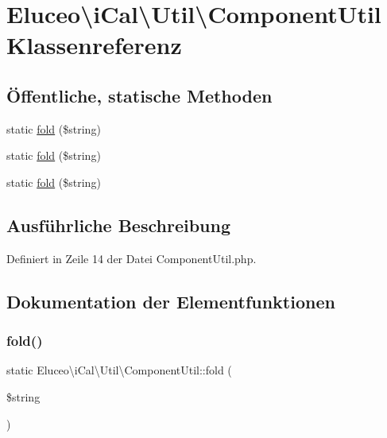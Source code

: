\hypertarget{class_eluceo_1_1i_cal_1_1_util_1_1_component_util}{}\section{Eluceo\textbackslash{}i\+Cal\textbackslash{}Util\textbackslash{}Component\+Util Klassenreferenz}
\label{class_eluceo_1_1i_cal_1_1_util_1_1_component_util}
\subsection*{Öffentliche, statische Methoden}
\begin{DoxyCompactItemize}
\item 
static \mbox{\hyperlink{class_eluceo_1_1i_cal_1_1_util_1_1_component_util_a8b295bedfc690ba2f52a884f52726d22}{fold}} (\$string)
\item 
static \mbox{\hyperlink{class_eluceo_1_1i_cal_1_1_util_1_1_component_util_a8b295bedfc690ba2f52a884f52726d22}{fold}} (\$string)
\item 
static \mbox{\hyperlink{class_eluceo_1_1i_cal_1_1_util_1_1_component_util_a8b295bedfc690ba2f52a884f52726d22}{fold}} (\$string)
\end{DoxyCompactItemize}


\subsection{Ausführliche Beschreibung}


Definiert in Zeile 14 der Datei Component\+Util.\+php.



\subsection{Dokumentation der Elementfunktionen}
\mbox{\label{class_eluceo_1_1i_cal_1_1_util_1_1_component_util_a8b295bedfc690ba2f52a884f52726d22}} 
\subsubsection{\texorpdfstring{fold()}{fold()}\hspace{0.1cm}{\footnotesize\ttfamily [1/3]}}
{\footnotesize\ttfamily static Eluceo\textbackslash{}i\+Cal\textbackslash{}\+Util\textbackslash{}\+Component\+Util\+::fold (\begin{DoxyParamCaption}\item[{}]{\$string }\end{DoxyParamCaption})\hspace{0.3cm}{\ttfamily [static]}}

